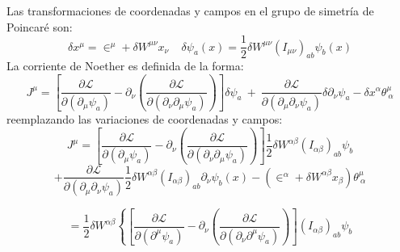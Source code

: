 \documentclass[a4paper,12pt]{article}
\begin{document}
Las transformaciones de coordenadas y campos en el grupo de simetría de Poincaré son:
\begin{equation}
\delta x^{\mu}=\in^{\mu}+\delta W^{\mu \nu}x_\nu\ \ \ \ \ \delta\psi_{a}(x)=\frac{1}{2}\delta W^{\mu \nu}(I_{\mu \nu})_{ab}\psi_{b}(x)   
\end{equation}
La corriente de Noether es definida de la forma:
\begin{equation}
J^\mu=\left[\frac{\partial \mathscr{L} }{\partial(\partial_{\mu} \psi_a)}-\partial_{\nu}\left(\frac{\partial\mathscr{L} }{\partial(\partial_{\nu}\partial_{\mu} \psi_a)}  \right) \right]\delta\psi_a\ +\ \frac{\partial\mathscr{L} }{\partial(\partial_{\mu}\partial_{\nu} \psi_a)}\delta\partial_\nu\psi_a-\delta x^\alpha\theta^\mu_{\ \alpha}
\end{equation}
reemplazando las variaciones de coordenadas y campos:
\begin{equation}
J^\mu=\left[\frac{\partial \mathscr{L} }{\partial(\partial_{\mu} \psi_a)}-\partial_{\nu}\left(\frac{\partial\mathscr{L} }{\partial(\partial_{\nu}\partial_{\mu} \psi_a)}  \right) \right]\frac{1}{2}\delta W^{\alpha\beta}(I_{\alpha\beta})_{ab}\psi_{b}
\end{equation}
$$+\frac{\partial\mathscr{L} }{\partial(\partial_{\mu}\partial_{\nu} \psi_a)}\frac{1}{2}\delta W^{\alpha\beta}(I_{\alpha\beta})_{ab}\partial_\nu\psi_{b}(x) -(\in^{\alpha}+\delta W^{\alpha\beta}x_\beta)\theta^\mu_{\ \alpha}$$
\vspace{0.1cm}

$$=\frac{1}{2}\delta W^{\alpha\beta}\left\{ \left[\frac{\partial \mathscr{L} }{\partial(\partial^{\mu} \psi_a)}-\partial_{\nu}\left(\frac{\partial\mathscr{L} }{\partial(\partial_{\nu}\partial^{\mu} \psi_a)}  \right) \right](I_{\alpha\beta})_{ab}\psi_{b}\right.$$
\vspace{0.1cm}
\end{document}
